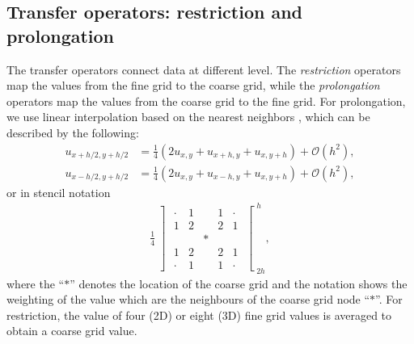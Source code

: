 \subsection{Transfer operators: restriction and prolongation} %
\label{section3.1.4}
The transfer operators connect data at different level.
The \textit{restriction} operators map the values from the fine grid to the coarse grid,
while the \textit{prolongation} operators map the values from the coarse grid to the fine grid.
For prolongation,
we use linear interpolation based on the nearest neighbors \cite{teunissen2019geometric,zhang2016boxlib,teunissen2018afivo},
which can be described by the following:
\begin{align}
    u_{x+h/2,y+h/2} &= \frac{1}{4} \left(2 u_{x,y} + u_{x+h, y} + u_{x,y+h} \right) + \mathcal{O}\left(h^2 \right),\\
    u_{x-h/2,y+h/2} &= \frac{1}{4} \left(2 u_{x,y} + u_{x-h, y} + u_{x,y+h} \right) + \mathcal{O}\left(h^2 \right),
\end{align}
or in stencil notation
\begin{align*}
	\frac{1}{4} \left]\begin{array}{ccccc}
		\cdot  & 1 &   & 1 & \cdot	\\
		1 & 2 &   & 2 & 1	\\
		  &   & * &   &  	\\
		1 & 2 &   & 2 & 1	\\
		\cdot & 1 &   & 1 & \cdot
	\end{array}\right[^h_{2h},
\end{align*}
where the ``$*$'' denotes the location of the coarse grid
and the notation shows the weighting of the value which are the neighbours of the coarse grid node ``$*$''.
For restriction, the value of four (2D) or eight (3D) fine grid values is averaged to obtain a coarse grid value.


